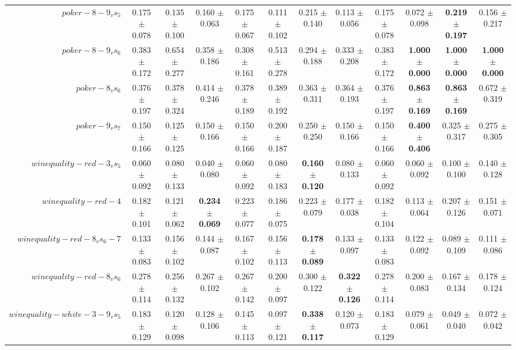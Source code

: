 \begin{table}[!ht]
{\begin{tabular}{r c c c c c c c c c c c}
$poker-8-9_vs_5$ & 0.175 $\pm$ 0.078 & 0.135 $\pm$ 0.100 & 0.160 $\pm$ 0.063 & 0.175 $\pm$ 0.067 & 0.111 $\pm$ 0.102 & 0.215 $\pm$ 0.140 & 0.113 $\pm$ 0.056 & 0.175 $\pm$ 0.078 & 0.072 $\pm$ 0.098 & \textbf{0.219 $\pm$ 0.197} & 0.156 $\pm$ 0.217 \\
$poker-8-9_vs_6$ & 0.383 $\pm$ 0.172 & 0.654 $\pm$ 0.277 & 0.358 $\pm$ 0.186 & 0.308 $\pm$ 0.161 & 0.513 $\pm$ 0.278 & 0.294 $\pm$ 0.188 & 0.333 $\pm$ 0.208 & 0.383 $\pm$ 0.172 & \textbf{1.000 $\pm$ 0.000} & \textbf{1.000 $\pm$ 0.000} & \textbf{1.000 $\pm$ 0.000} \\
$poker-8_vs_6$ & 0.376 $\pm$ 0.197 & 0.378 $\pm$ 0.324 & 0.414 $\pm$ 0.246 & 0.378 $\pm$ 0.189 & 0.389 $\pm$ 0.192 & 0.363 $\pm$ 0.311 & 0.364 $\pm$ 0.193 & 0.376 $\pm$ 0.197 & \textbf{0.863 $\pm$ 0.169} & \textbf{0.863 $\pm$ 0.169} & 0.672 $\pm$ 0.319 \\
$poker-9_vs_7$ & 0.150 $\pm$ 0.166 & 0.125 $\pm$ 0.125 & 0.150 $\pm$ 0.166 & 0.150 $\pm$ 0.166 & 0.200 $\pm$ 0.187 & 0.250 $\pm$ 0.250 & 0.150 $\pm$ 0.166 & 0.150 $\pm$ 0.166 & \textbf{0.400 $\pm$ 0.406} & 0.325 $\pm$ 0.317 & 0.275 $\pm$ 0.305 \\
$winequality-red-3_vs_5$ & 0.060 $\pm$ 0.092 & 0.080 $\pm$ 0.133 & 0.040 $\pm$ 0.080 & 0.060 $\pm$ 0.092 & 0.080 $\pm$ 0.183 & \textbf{0.160 $\pm$ 0.120} & 0.080 $\pm$ 0.133 & 0.060 $\pm$ 0.092 & 0.060 $\pm$ 0.092 & 0.100 $\pm$ 0.100 & 0.140 $\pm$ 0.128 \\
$winequality-red-4$ & 0.182 $\pm$ 0.101 & 0.121 $\pm$ 0.062 & \textbf{0.234 $\pm$ 0.069} & 0.223 $\pm$ 0.077 & 0.186 $\pm$ 0.075 & 0.223 $\pm$ 0.079 & 0.177 $\pm$ 0.038 & 0.182 $\pm$ 0.104 & 0.113 $\pm$ 0.064 & 0.207 $\pm$ 0.126 & 0.151 $\pm$ 0.071 \\
$winequality-red-8_vs_6-7$ & 0.133 $\pm$ 0.083 & 0.156 $\pm$ 0.102 & 0.144 $\pm$ 0.087 & 0.167 $\pm$ 0.102 & 0.156 $\pm$ 0.113 & \textbf{0.178 $\pm$ 0.089} & 0.133 $\pm$ 0.097 & 0.133 $\pm$ 0.083 & 0.122 $\pm$ 0.092 & 0.089 $\pm$ 0.109 & 0.111 $\pm$ 0.086 \\
$winequality-red-8_vs_6$ & 0.278 $\pm$ 0.114 & 0.256 $\pm$ 0.132 & 0.267 $\pm$ 0.102 & 0.267 $\pm$ 0.142 & 0.200 $\pm$ 0.097 & 0.300 $\pm$ 0.122 & \textbf{0.322 $\pm$ 0.126} & 0.278 $\pm$ 0.114 & 0.200 $\pm$ 0.083 & 0.167 $\pm$ 0.134 & 0.178 $\pm$ 0.124 \\
$winequality-white-3-9_vs_5$ & 0.183 $\pm$ 0.129 & 0.120 $\pm$ 0.098 & 0.128 $\pm$ 0.106 & 0.145 $\pm$ 0.113 & 0.097 $\pm$ 0.121 & \textbf{0.338 $\pm$ 0.117} & 0.120 $\pm$ 0.073 & 0.183 $\pm$ 0.129 & 0.079 $\pm$ 0.061 & 0.049 $\pm$ 0.040 & 0.072 $\pm$ 0.042 \\

\end{tabular}}
\end{table}
